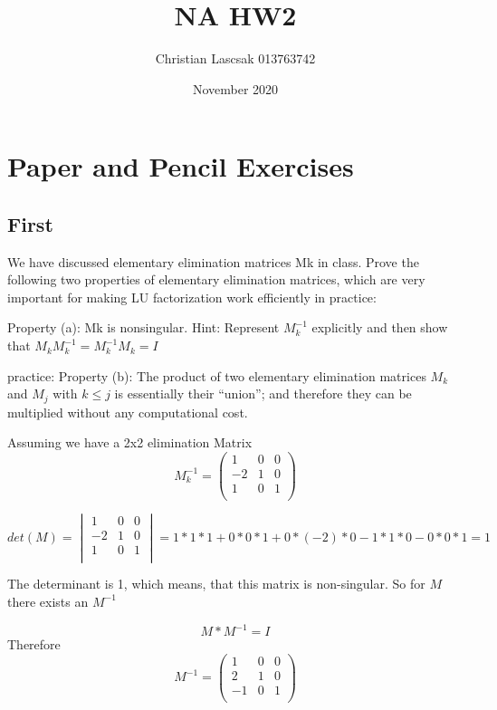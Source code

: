 \documentclass{article}
\title{NA HW2}
\author{Christian Lascsak 013763742}
\date{November 2020}
\begin{document}
\maketitle

\section{Paper and Pencil Exercises}
\subsection{First}
We have discussed elementary elimination matrices Mk in class. Prove the
following two properties of elementary elimination matrices, which are very important for
making LU factorization work efficiently in practice:

\par\noindent
Property (a): Mk is nonsingular.
Hint: Represent \(M_k^{-1}\)
explicitly and then show that \(M_k M_k^{-1} = M_k^{-1} M_k = I\)
\par
\noindent
practice:
Property (b): The product of two elementary elimination matrices \(M_k\) and \(M_j\) with \(k \leq j\) is essentially their “union”; and therefore they can be multiplied without any computational
cost.
\par\noindent
Assuming we have a 2x2 elimination Matrix 
\begin{equation}
    M_k^{-1} =
    \left( 
    \begin{array}{rrrr}
    1 & 0 & 0\\
    -2 & 1 & 0\\
    1 & 0 & 1\\
    \end{array}\right)
\end{equation}

\begin{equation}
    det(M) = \begin{vmatrix}
    1 & 0 & 0\\
    -2 & 1 & 0\\
    1 & 0 & 1\\
    \end{vmatrix} = 1*1*1 + 0*0*1 + 0*(-2)*0 - 1*1*0 - 0*0*1 = 1
\end{equation}

\par\noindent
The determinant is 1, which means, that this matrix is non-singular. So for \(M\) there exists an \(M^{-1}\)

\begin{equation}
    M * M^{-1} = I
\end{equation}
Therefore 
\begin{equation}
    M^{-1} =  \left( \begin{array}{rrrr}
    1 & 0 & 0\\
    2 & 1 & 0\\
    -1 & 0 & 1\\
    \end{array}\right)
\end{equation}
\end{document}
